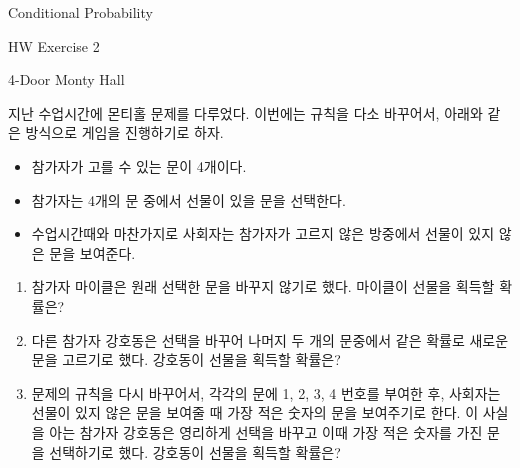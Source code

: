 \begin{edXchapter}{Conditional Probability}

\begin{edXsection}{HW Exercise 2}

\begin{edXvertical}

\begin{edXproblem}{4-Door Monty Hall}

지난 수업시간에 몬티홀 문제를 다루었다. 이번에는 규칙을 다소 바꾸어서, 아래와 같은 방식으로 게임을 진행하기로 하자.
\begin{itemize}
\item 참가자가 고를 수 있는 문이 4개이다.
\item 참가자는 4개의 문 중에서 선물이 있을 문을 선택한다.
\item 수업시간때와 마찬가지로 사회자는 참가자가 고르지 않은 방중에서 선물이 있지 않은 문을 보여준다. 
\end{itemize}

\begin{enumerate}
\item 참가자 마이클은 원래 선택한 문을 바꾸지 않기로 했다. 마이클이 선물을 획득할 확률은?

\item 다른 참가자 강호동은 선택을 바꾸어 나머지 두 개의 문중에서 같은 확률로 새로운 문을 고르기로 했다. 강호동이 선물을 획득할 확률은?

\item 문제의 규칙을 다시 바꾸어서, 각각의 문에 1, 2, 3, 4 번호를 부여한 후, 사회자는 선물이 있지 않은 문을 보여줄 때 가장 적은 숫자의 문을 보여주기로 한다. 이 사실을 아는 참가자 강호동은 영리하게 선택을 바꾸고 이때 가장 적은 숫자를 가진 문을 선택하기로 했다. 강호동이 선물을 획득할 확률은?
\end{enumerate}
\end{edXproblem}

\end{edXvertical}
\end{edXsection}
\end{edXchapter}


 

 


